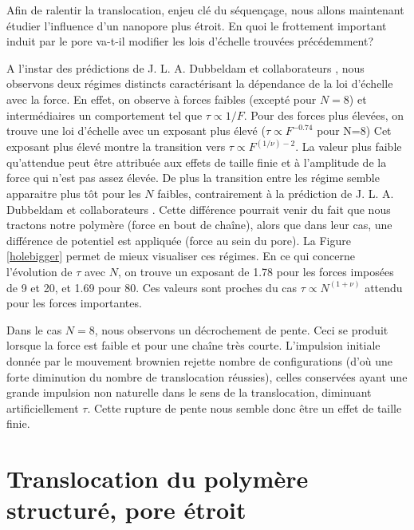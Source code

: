 Afin de ralentir la translocation, enjeu clé du séquençage, nous allons maintenant étudier l'influence d'un nanopore plus étroit. En quoi le frottement important induit par le pore va-t-il modifier les lois d'échelle trouvées précédemment?






A l'instar des prédictions de J. L. A. Dubbeldam et collaborateurs \cite{traction}, nous observons deux régimes distincts caractérisant la dépendance de la loi d'échelle avec la force. En effet, on observe à forces faibles (excepté pour $N=8$) et intermédiaires un comportement tel que $\tau \propto 1/F$. Pour des forces plus élevées, on trouve une loi d'échelle avec un exposant plus élevé ($\tau \propto F^{-0.74}$ pour N=8) Cet exposant plus élevé montre la transition vers $\tau \propto F^{(1/\nu) -2}$. La valeur plus faible qu'attendue peut être attribuée aux effets de taille finie et à l'amplitude de la force qui n'est pas assez élevée. De plus la transition entre les régime semble apparaitre plus tôt pour les $N$ faibles, contrairement à la prédiction de J. L. A. Dubbeldam et collaborateurs \cite{traction}. Cette différence pourrait venir du fait que nous tractons notre polymère (force en bout de chaîne), alors que dans leur cas, une différence de potentiel est appliquée (force au sein du pore). La Figure \ref{holebigger} permet de mieux visualiser ces régimes. En ce qui concerne l'évolution de $\tau$ avec $N$, on trouve un exposant de 1.78 pour les forces imposées de 9 et 20, et 1.69 pour 80. Ces valeurs sont proches du cas $\tau \propto N^{(1+\nu)}$ attendu pour les forces importantes.

Dans le cas $N=8$, nous observons un décrochement de pente. Ceci se produit lorsque la force est faible et pour une chaîne très courte. L'impulsion initiale donnée par le mouvement brownien rejette nombre de configurations (d’où une forte diminution du nombre de translocation réussies), celles conservées ayant une grande impulsion non naturelle dans le sens de la translocation, diminuant artificiellement $\tau$. Cette rupture de pente nous semble donc être un effet de taille finie.



\section{Translocation du polymère structuré, pore étroit}



